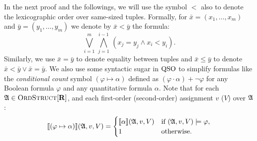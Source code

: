 In the next proof and the followings, we will use the symbol $<$ also to denote the lexicographic order over same-sized tuples. Formally, for $\bar{x} = (x_1,\ldots,x_m)$ and $\bar{y} = (y_1,\ldots,y_m)$ we denote by $\bar{x} < \bar{y}$ the formula:
$$
\bigvee_{i = 1}^m \, \bigwedge_{j = 1}^{i-1} \, (x_j = y_j \wedge x_i < y_i).
$$
Similarly, we use $\bar{x} = \bar{y}$ to denote equality between tuples and $\bar{x} \leq \bar{y}$  to denote $\bar{x} < \bar{y} \vee \bar{x} = \bar{y}$.
We also use some syntactic sugar in ${\rm QSO}$ to simplify formulas like the {\em conditional count} symbol $(\varphi \mapsto \alpha)$ defined as $ (\varphi\cdot\alpha) + \neg\varphi$ for any Boolean formula $\varphi$ and any quantitative formula $\alpha$. Note that for each $\mathfrak{A} \in \text{\sc OrdStruct}[\mathbf{R}]$, and each first-order (second-order) assignment $v$ ($V$) over $\mathfrak{A}$:
\[
{\llbracket{}{(\varphi \mapsto \alpha)}\rrbracket}(\mathfrak{A},v,V) = 
\begin{cases}
{\llbracket{}{\alpha}\rrbracket}(\mathfrak{A},v,V) &\text{if } (\mathfrak{A},v,V)\models\varphi,\\
1 &\text{otherwise}.
\end{cases}
\]

